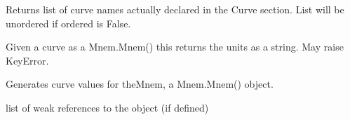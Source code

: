 \documentclass[letterpaper,10pt,english]{sphinxmanual}
\begin{document}
\begin{fulllineitems}
\begin{fulllineitems}
\end{fulllineitems}


\begin{fulllineitems}
\label{\detokenize{ref/LAS/core/LASRead:TotalDepth.LAS.core.LASRead.LASBase.curveMnems}}
Returns list of curve names actually declared in the Curve section.
List will be unordered if ordered is False.

\end{fulllineitems}


\begin{fulllineitems}
\label{\detokenize{ref/LAS/core/LASRead:TotalDepth.LAS.core.LASRead.LASBase.curveUnitsAsStr}}
Given a curve as a Mnem.Mnem() this returns the units as a string.
May raise KeyError.

\end{fulllineitems}


\begin{fulllineitems}
\label{\detokenize{ref/LAS/core/LASRead:TotalDepth.LAS.core.LASRead.LASBase.genOutpPoints}}
Generates curve values for theMnem, a Mnem.Mnem() object.

\end{fulllineitems}


\begin{fulllineitems}
\label{\detokenize{ref/LAS/core/LASRead:TotalDepth.LAS.core.LASRead.LASBase.__weakref__}}
list of weak references to the object (if defined)

\end{fulllineitems}


\end{fulllineitems}

\end{document}
